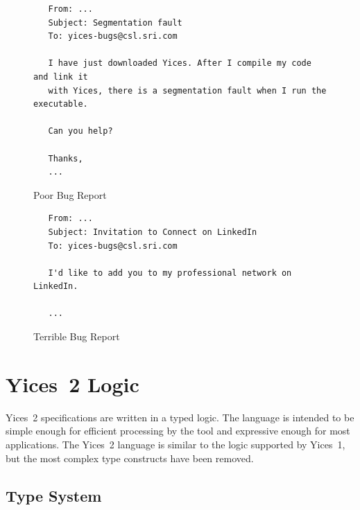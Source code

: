 \documentclass[11pt,twoside,fleqn,openright,titlepage]{cslreport}
\begin{document}
\begin{figure}
\begin{center}
\begin{footnotesize}
\begin{verbatim}
   From: ...
   Subject: Segmentation fault
   To: yices-bugs@csl.sri.com

   I have just downloaded Yices. After I compile my code and link it
   with Yices, there is a segmentation fault when I run the executable.

   Can you help?

   Thanks,
   ...
\end{verbatim}
\end{footnotesize}
\end{center}
\caption{Poor Bug Report}
\label{bad-report}
\end{figure}

\begin{figure}
\begin{center}
\begin{footnotesize}
\begin{verbatim}
   From: ...
   Subject: Invitation to Connect on LinkedIn
   To: yices-bugs@csl.sri.com

   I'd like to add you to my professional network on LinkedIn.

   ...
\end{verbatim}
\end{footnotesize}
\end{center}
\caption{Terrible Bug Report}
\label{terrible-report}
\end{figure}




\chapter{Yices~2 Logic}
\label{language}

Yices~2 specifications are  written in a typed logic.  The language is
intended to be simple enough  for efficient processing by the tool and
expressive  enough  for most  applications.  The  Yices~2 language  is
similar to the  logic supported by Yices~1, but  the most complex type
constructs have been removed.


\section{Type System}
\label{type-system}
\end{document}
